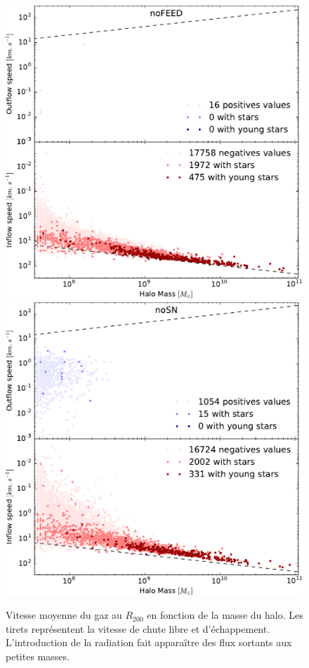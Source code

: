 \begin{figure}
	\centering
	\includegraphics[height=.45\textheight]{img/03/flux_speed_noFEED.pdf} 
	\includegraphics[height=.45\textheight]{img/03/flux_speed_noSN.pdf} 
    \caption[Vitesse du gaz au $R_{200}$ 1]{Vitesse moyenne du gaz au $R_{200}$ en fonction de la masse du halo.
    Les tirets représentent la vitesse de chute libre et d'échappement.
    L'introduction de la radiation fait apparaître des flux sortants aux petites masses.
 	\label{fig:R200speed1}}
\end{figure}

